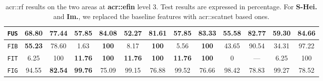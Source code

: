 \begin{table}[htpb]
\begin{center}
\begin{tabular}{| c | c c | c c | c c | c c | c c | c c |}
                        \hline
                        \texttt{FUS} & \textbf{68.80} & 77.44 & 57.85 & 84.08 & 52.27 & 81.61 & 57.85 & 83.33 & 55.58 & 82.77 & 59.30 & \textbf{84.66} \\
                        \hline
                        \texttt{FIB} & \textbf{55.23} & 78.60 & 1.63 & \textbf{100} & 8.17 & \textbf{100} & 5.56 & \textbf{100} & 43.65 & 90.54 & 34.31 & 97.22 \\
                        \hline
                        \texttt{FIT} & 6.25 & 100 & \textbf{11.76} & \textbf{100} & \textbf{11.76} & \textbf{100} & \textbf{11.76} & \textbf{100} & 0 & --- & 6.25 & 100 \\
                        \hline
                        \texttt{FIG} & 94.55 & \textbf{82.54} & \textbf{99.76} & 75.09 & 99.15 & 76.88 & 99.52 & 76.66 & 98.42 & 78.83 & 99.27 & 78.52 \\
                        \hline
                    \end{tabular}
                \end{center}
                \caption{
                    \label{tab::stats_scat_pca_rf_f3}
                    \gls{acr::rf} results on the two areas at \textbf{\gls{acr::efin}} level 3.
                    Test results are expressed in percentage.
                    For \textbf{S-Hei.} and \textbf{Im.}, we replaced the baseline features with \gls{acr::scatnet} based ones.
                }
            \end{table}

